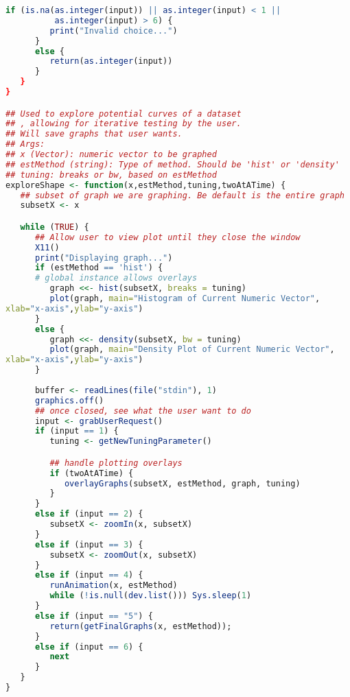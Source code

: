\documentclass{article}
\begin{document}
\begin{lstlisting}[frame=single,language=R,showstringspaces=false]
      if (is.na(as.integer(input)) || as.integer(input) < 1 ||
          as.integer(input) > 6) {
         print("Invalid choice...")
      }
      else {
         return(as.integer(input))
      }
   }
}

## Used to explore potential curves of a dataset
## , allowing for iterative testing by the user. 
## Will save graphs that user wants.
## Args:
## x (Vector): numeric vector to be graphed
## estMethod (string): Type of method. Should be 'hist' or 'density'
## tuning: breaks or bw, based on estMethod
exploreShape <- function(x,estMethod,tuning,twoAtATime) {
   ## subset of graph we are graphing. Be default is the entire graph
   subsetX <- x

   while (TRUE) {
      ## Allow user to view plot until they close the window
      X11()
      print("Displaying graph...")
      if (estMethod == 'hist') {
	  # global instance allows overlays
         graph <<- hist(subsetX, breaks = tuning) 
         plot(graph, main="Histogram of Current Numeric Vector", 
xlab="x-axis",ylab="y-axis")
      }
      else {
         graph <<- density(subsetX, bw = tuning)
         plot(graph, main="Density Plot of Current Numeric Vector",
xlab="x-axis",ylab="y-axis")
      }
      
      buffer <- readLines(file("stdin"), 1)
      graphics.off()
      ## once closed, see what the user want to do
      input <- grabUserRequest()
      if (input == 1) {
         tuning <- getNewTuningParameter()

         ## handle plotting overlays
         if (twoAtATime) {
            overlayGraphs(subsetX, estMethod, graph, tuning)
         }
      }
      else if (input == 2) {
         subsetX <- zoomIn(x, subsetX)
      }
      else if (input == 3) {
         subsetX <- zoomOut(x, subsetX)
      }
      else if (input == 4) {
         runAnimation(x, estMethod)
         while (!is.null(dev.list())) Sys.sleep(1)
      }
      else if (input == "5") {
         return(getFinalGraphs(x, estMethod));
      }
      else if (input == 6) {
         next
      }
   }
}

\end{lstlisting}
\end{document}
